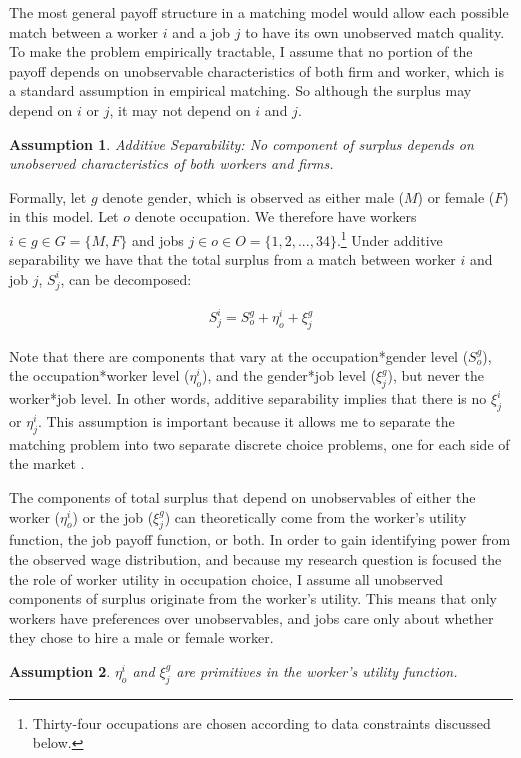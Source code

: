 \documentclass[12pt]{article}
\newtheorem{assumption}{Assumption}
\begin{document}
The most general payoff structure in a matching model would allow each possible match between a worker $i$ and a job $j$ to have its own unobserved match quality. To make the problem empirically tractable, I assume that no portion of the payoff depends on unobservable characteristics of both firm and worker, which is a standard assumption in empirical matching. So although the surplus may depend on $i$ or $j$, it may not depend on $i$ and $j$.

\begin{assumption}
Additive Separability: No component of surplus depends on unobserved characteristics of both workers and firms.
\end{assumption}

Formally, let $g$ denote gender, which is observed as either male ($M$) or female ($F$) in this model. Let $o$ denote occupation. We therefore have workers $i \in g \in G= \{M,F\}$ and jobs $j \in o \in O = \{1,2,...,34\}$.\footnote{Thirty-four occupations are chosen according to data constraints discussed below.} Under additive separability we have that the total surplus from a match between worker $i$ and job $j$, $S^i_j$, can be decomposed:

\begin{align}
S^i_j = S^g_o + \eta^i_o + \xi^g_j
\end{align}


Note that there are components that vary at the occupation*gender level ($S^g_o$), the occupation*worker level ($\eta^i_o$), and the gender*job level ($\xi^g_j$), but never the worker*job level. In other words, additive separability implies that there is no $\xi^i_j$ or $\eta^i_j$. This assumption is important because it allows me to separate the matching problem into two separate discrete choice problems, one for each side of the market \cite{Galichon2013}.

The components of total surplus that depend on unobservables of either the worker ($\eta^i_o$) or the job ($\xi^g_j$) can theoretically come from the worker's utility function, the job payoff function, or both. In order to gain identifying power from the observed wage distribution, and because my research question is focused the the role of worker utility in occupation choice, I assume all unobserved components of surplus originate from the worker's utility. This means that only workers have preferences over unobservables, and jobs care only about whether they chose to hire a male or female worker.

\begin{assumption}
$\eta^i_o$ and $\xi^g_j$ are primitives in the worker's utility function.
\end{assumption}
\end{document}
